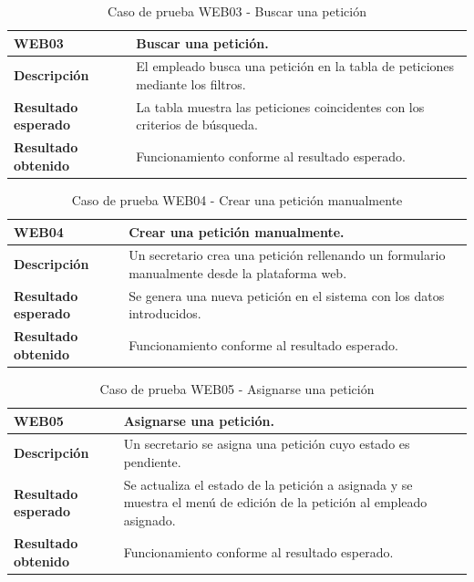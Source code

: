     \begin{table}[H]
        \centering
        \begin{tabular}{|l|p{12cm}|}
        \hline
        \textbf{WEB03} & Buscar una petición. \\ \hline
        \textbf{Descripción} & El empleado busca una petición en la tabla de peticiones mediante los filtros. \\ \hline
        \textbf{Resultado esperado} & La tabla muestra las peticiones coincidentes con los criterios de búsqueda. \\ \hline
        \textbf{Resultado obtenido} & Funcionamiento conforme al resultado esperado. \\ \hline
        \end{tabular}
        \caption{Caso de prueba WEB03 - Buscar una petición}
    \end{table}

    \begin{table}[H]
        \centering
        \begin{tabular}{|l|p{12cm}|}
        \hline
        \textbf{WEB04} & Crear una petición manualmente. \\ \hline
        \textbf{Descripción} &  Un secretario crea una petición rellenando un formulario manualmente desde la plataforma web. \\ \hline
        \textbf{Resultado esperado} & Se genera una nueva petición en el sistema con los datos introducidos. \\ \hline
        \textbf{Resultado obtenido} & Funcionamiento conforme al resultado esperado. \\ \hline
        \end{tabular}
        \caption{Caso de prueba WEB04 - Crear una petición manualmente}
    \end{table}

    \begin{table}[H]
        \centering
        \begin{tabular}{|l|p{12cm}|}
        \hline
        \textbf{WEB05} & Asignarse una petición. \\ \hline
        \textbf{Descripción} & Un secretario se asigna una petición cuyo estado es pendiente. \\ \hline
        \textbf{Resultado esperado} & Se actualiza el estado de la petición a asignada y se muestra el menú de edición de la petición al empleado asignado. \\ \hline
        \textbf{Resultado obtenido} & Funcionamiento conforme al resultado esperado. \\ \hline
        \end{tabular}
        \caption{Caso de prueba WEB05 - Asignarse una petición}
    \end{table}

